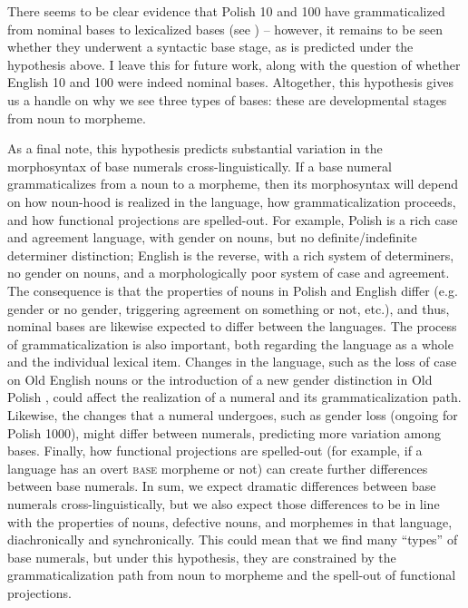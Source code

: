\documentclass[output=paper]{langscibook}
\begin{document}

There seems to be clear evidence that Polish 10 and 100 have grammaticalized from nominal bases to lexicalized bases (see ) -- however, it remains to be seen whether they underwent a syntactic base stage, as is predicted under the hypothesis above. I leave this for future work, along with the question of whether English 10 and 100 were indeed nominal bases. Altogether, this hypothesis gives us a handle on why we see three types of bases: these are developmental stages from noun to morpheme.

As a final note, this hypothesis predicts substantial variation in the morphosyntax of base numerals cross-linguistically. If a base numeral grammaticalizes from a noun to a morpheme, then its morphosyntax will depend on how noun-hood is realized in the language, how grammaticalization proceeds, and how functional projections are spelled-out. For example, Polish is a rich case and agreement language, with gender on nouns, but no definite/indefinite determiner distinction; English is the reverse, with a rich system of determiners, no gender on nouns, and a morphologically poor system of case and agreement. The consequence is that the properties of nouns in Polish and English differ (e.g. gender or no gender, triggering agreement on something or not, etc.), and thus, nominal bases are likewise expected to differ between the languages. The process of grammaticalization is also important, both regarding the language as a whole and the individual lexical item. Changes in the language, such as the loss of case on Old English nouns or the introduction of a new gender distinction in Old Polish \citep{miechowiczDziubala2013}, could affect the realization of a numeral and its grammaticalization path. Likewise, the changes that a numeral undergoes, such as gender loss (ongoing for Polish 1000), might differ between numerals, predicting more variation among bases. Finally, how functional projections are spelled-out (for example, if a language has an overt \textsc{base} morpheme or not) can create further differences between base numerals. In sum, we expect dramatic differences between base numerals cross-linguistically, but we also expect those differences to be in line with the properties of nouns, defective nouns, and morphemes in that language, diachronically and synchronically. This could mean that we find many ``types'' of base numerals, but under this hypothesis, they are constrained by the grammaticalization path from noun to morpheme and the spell-out of functional projections. 
\end{document}
